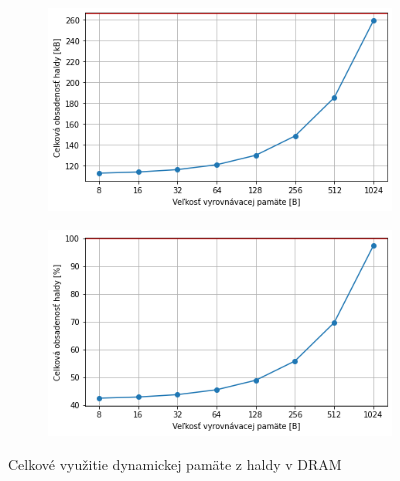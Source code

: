 \begin{figure}[h]
	\centering
    \begin{subfigure}[]{0.48\textwidth}
    	\centering
        \includegraphics[width=\textwidth]{figures/verification/memory-usage-bytes.png}
     \end{subfigure}
     \hfill
     \begin{subfigure}[]{0.48\textwidth}
        \centering
     	\includegraphics[width=\textwidth]{figures/verification/memory-usage-percentage.png}
     \end{subfigure}
     \caption{Celkové využitie dynamickej pamäte z haldy v DRAM}
\end{figure}

